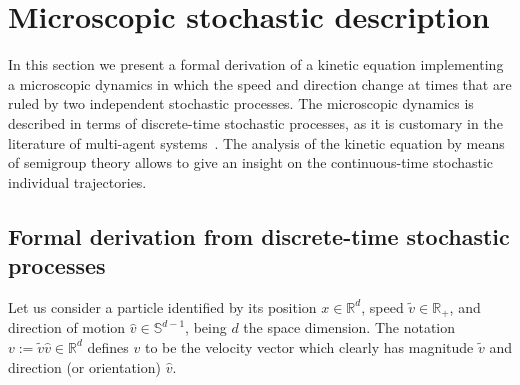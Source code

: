 \documentclass[a4paper]{article}
\theoremstyle{Theorem}\newtheorem{proposition}{Proposition}[section]
\theoremstyle{Remark}\newtheorem{remark}{Remark}[section]
\theoremstyle{Theorem}\newtheorem{theorem}{Theorem}[section]
\newcommand{\R}{\mathbb{R}}
\newcommand{\hv}{\hat{v}}
\newcommand{\tv}{\tilde{v}}
\begin{document}
 


\section{Microscopic stochastic description}\label{sec:micro_des}
In this section we present a formal derivation of a kinetic equation implementing a microscopic dynamics in which the speed and direction change at times that are ruled by two independent stochastic processes. The microscopic dynamics is described in terms of discrete-time stochastic processes, as it is customary in the literature of multi-agent systems~\cite{pareschi2013BOOK}. The analysis of the kinetic equation by means of semigroup theory allows to give an insight on the continuous-time stochastic individual trajectories.
\subsection{Formal derivation from discrete-time stochastic processes}
 Let us consider a particle identified by its position $x\in \mathbb{R}^d$, speed $\tv \in \R_+$, and direction of motion $\hv \in \mathbb{S}^{d-1}$, being $d$ the space dimension.  The notation $v:= \tv \hv \in \mathbb{R}^d$
defines $v$ to be the velocity vector which clearly has magnitude $\tv$ and direction (or orientation) $\hv$.
\end{document}
